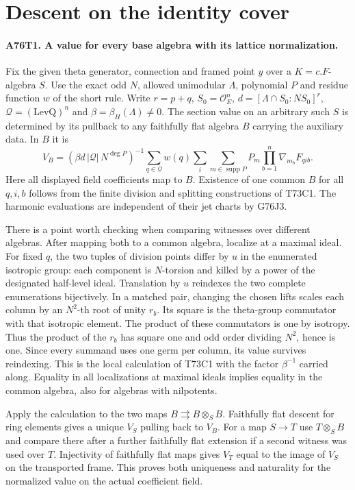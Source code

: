 \section{Descent on the identity cover}

\paragraph{A76T1. A value for every base algebra with its lattice normalization.}
Fix the given theta generator, connection and framed point $y$
over a $K=c.F$-algebra $S$. Use the exact odd $N$, allowed
unimodular $\Lambda$, polynomial $P$ and residue function $w$
of the short rule. Write $r=p+q$, $S_0=\mathcal O_E^n$,
$d=[\Lambda\cap S_0:NS_0]^r$, $\mathcal Q=(\mathrm{LevQ})^n$
and $\beta=\beta_H(\Lambda)\ne0$. The section value on an arbitrary
such $S$ is determined by its pullback to any faithfully flat
algebra $B$ carrying the auxiliary data. In $B$ it is
\[
 V_B=(\beta d\,|\mathcal Q|\,N^{\deg P})^{-1}
 \sum_{q\in\mathcal Q}w(q)\sum_i
 \sum_{m\in\operatorname{supp}P}P_m
       \prod_{b=1}^n\nabla_{m_b}F_{qib}.
\]
Here all displayed field coefficients map to $B$. Existence of
one common $B$ for all $q,i,b$ follows from the finite division
and splitting constructions of T73C1. The harmonic evaluations
are independent of their jet charts by G76J3.

There is a point worth checking when comparing witnesses over
different algebras. After mapping both to a common algebra, localize
at a maximal ideal. For fixed $q$, the two tuples of division
points differ by $u$ in the enumerated isotropic group: each
component is $N$-torsion and killed by a power of the designated
half-level ideal. Translation by $u$ reindexes the two complete
enumerations bijectively. In a matched pair, changing the chosen
lifts scales each column by an $N^2$-th root of unity $r_b$.
Its square is the theta-group commutator with that isotropic
element. The product of these commutators is one by isotropy.
Thus the product of the $r_b$ has square one and odd order dividing
$N^2$, hence is one. Since every summand uses one germ per column,
its value survives reindexing. This is the local calculation of
T73C1 with the factor $\beta^{-1}$ carried along. Equality in
all localizations at maximal ideals implies equality in the common
algebra, also for algebras with nilpotents.

Apply the calculation to the two maps
$B\rightrightarrows B\otimes_S B$. Faithfully flat descent for
ring elements gives a unique $V_S$ pulling back to $V_B$. For a
map $S\to T$ use $T\otimes_S B$ and compare there after a further
faithfully flat extension if a second witness was used over $T$.
Injectivity of faithfully flat maps gives $V_T$ equal to the image
of $V_S$ on the transported frame. This proves both uniqueness
and naturality for the normalized value on the actual coefficient
field.

